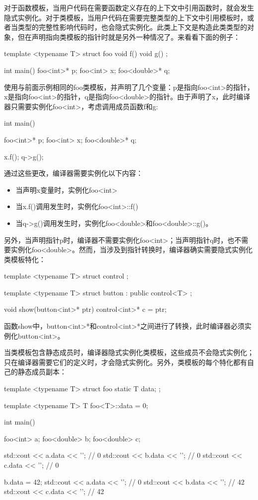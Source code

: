 对于函数模板，当用户代码在需要函数定义存在的上下文中引用函数时，就会发生隐式实例化。对于类模板，当用户代码在需要完整类型的上下文中引用模板时，或者当类型的完整性影响代码时，也会隐式实例化。此类上下文是构造此类类型的对象，但在声明指向类模板的指针时就是另外一种情况了。来看看下面的例子：

\begin{cpp}
template <typename T>
struct foo
{
	void f() {}
	void g() {}
};

int main()
{
	foo<int>* p;
	foo<int> x;
	foo<double>* q;
}
\end{cpp}

使用与前面示例相同的foo类模板，并声明了几个变量：p是指向foo<int>的指针，x是指向foo<int>的指针，q是指向foo<double>的指针。由于声明了x，此时编译器只需要实例化foo<int>，考虑调用成员函数f和g:

\begin{cpp}
int main()
{
	foo<int>* p;
	foo<int> x;
	foo<double>* q;
	
	x.f();
	q->g();
}
\end{cpp}

通过这些更改，编译器需要实例化以下内容：

\begin{itemize}
  \item 当声明x变量时，实例化foo<int>
  \item 当x.f()调用发生时，实例化foo<int>::f()
  \item 当q->g()调用发生时，实例化foo<double>和foo<double>::g()。
\end{itemize}

另外，当声明指针p时，编译器不需要实例化foo<int>；当声明指针q时，也不需要实例化foo<double>。然而，当涉及到指针转换时，编译器确实需要隐式实例化类模板特化：

\begin{cpp}
template <typename T>
struct control
{};

template <typename T>
struct button : public control<T>
{};

void show(button<int>* ptr)
{
	control<int>* c = ptr;
}
\end{cpp}

函数show中，button<int>*和control<int>*之间进行了转换，此时编译器必须实例化button<int>。

当类模板包含静态成员时，编译器隐式实例化类模板，这些成员不会隐式实例化；只在编译器需要它们的定义时，才会隐式实例化。另外，类模板的每个特化都有自己的静态成员副本：

\begin{cpp}
template <typename T>
struct foo
{
	static T data;
};

template <typename T> T foo<T>::data = 0;

int main()
{
	foo<int> a;
	foo<double> b;
	foo<double> c;
	
	std::cout << a.data << '\n'; // 0
	std::cout << b.data << '\n'; // 0
	std::cout << c.data << '\n'; // 0
	
	b.data = 42;
	std::cout << a.data << '\n'; // 0
	std::cout << b.data << '\n'; // 42
	std::cout << c.data << '\n'; // 42
}
\end{cpp}

